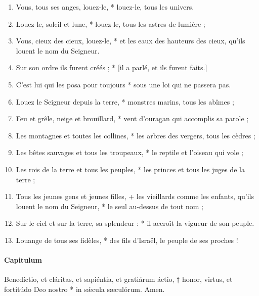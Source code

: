 \documentclass[twoside]{article}
\begin{document}
\begin{paracol}[1]{2}
\begin{enumerate}[wide, itemsep=0mm, labelwidth=!, labelindent=0pt, label=\color{gregoriocolor}\theenumi]
\item Vous, tous ses anges, louez-le, *
louez-le, tous les univers.

\item Louez-le, soleil et lune, *
louez-le, tous les astres de lumière ;

\item Vous, cieux des cieux, louez-le, *
et les eaux des hauteurs des cieux, qu’ils louent le nom du Seigneur.

\item Sur son ordre ils furent créés ; * [il a parlé, et ils furent faits.]

\item C’est lui qui les posa pour toujours *
sous une loi qui ne passera pas.

\item Louez le Seigneur depuis la terre, *
monstres marins, tous les abîmes ;

\item Feu et grêle, neige et brouillard, *
vent d’ouragan qui accomplis sa parole ;

\item Les montagnes et toutes les collines, *
les arbres des vergers, tous les cèdres ;

\item Les bêtes sauvages et tous les troupeaux, *
le reptile et l’oiseau qui vole ;

\item Les rois de la terre et tous les peuples, *
les princes et tous les juges de la terre ;

\item Tous les jeunes gens et jeunes filles, +
les vieillards comme les enfants, qu’ils louent le nom du Seigneur, *
le seul au-dessus de tout nom ;

\item Sur le ciel et sur la terre, sa splendeur : *
il accroît la vigueur de son peuple.

\item Louange de tous ses fidèles, *
des fils d’Israël, le peuple de ses proches !

\end{enumerate}
\switchcolumn*

\paragraph{Capitulum}
Benedíctio, et cláritas, et sapiéntia, et gratiárum áctio, † honor, virtus, et fortitúdo Deo nostro * in sǽcula sæculórum. Amen.



\end{paracol}
\end{document}
